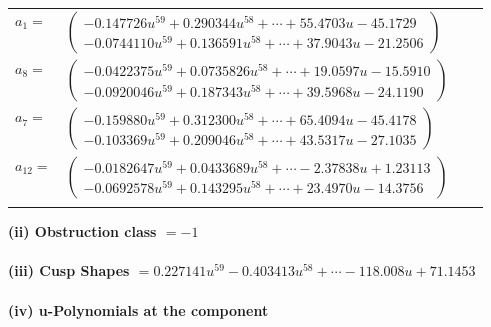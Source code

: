\documentclass[1p]{elsarticle_modified}
\theoremstyle{definition}
\begin{document}
\begin{tabular}{m{7pt} m{180pt} m{7pt} m{180pt} }
\flushright $a_{1}=$&$\begin{pmatrix}-0.147726 u^{59}+0.290344 u^{58}+\cdots+55.4703 u-45.1729\\-0.0744110 u^{59}+0.136591 u^{58}+\cdots+37.9043 u-21.2506\end{pmatrix}$ \\
\flushright $a_{8}=$&$\begin{pmatrix}-0.0422375 u^{59}+0.0735826 u^{58}+\cdots+19.0597 u-15.5910\\-0.0920046 u^{59}+0.187343 u^{58}+\cdots+39.5968 u-24.1190\end{pmatrix}$ \\
\flushright $a_{7}=$&$\begin{pmatrix}-0.159880 u^{59}+0.312300 u^{58}+\cdots+65.4094 u-45.4178\\-0.103369 u^{59}+0.209046 u^{58}+\cdots+43.5317 u-27.1035\end{pmatrix}$ \\
\flushright $a_{12}=$&$\begin{pmatrix}-0.0182647 u^{59}+0.0433689 u^{58}+\cdots-2.37838 u+1.23113\\-0.0692578 u^{59}+0.143295 u^{58}+\cdots+23.4970 u-14.3756\end{pmatrix}$\\&\end{tabular}
\flushleft \textbf{(ii) Obstruction class $= -1$}\\~\\
\flushleft \textbf{(iii) Cusp Shapes $= 0.227141 u^{59}-0.403413 u^{58}+\cdots-118.008 u+71.1453$}\\~\\
\newpage\renewcommand{\arraystretch}{1}
\flushleft \textbf{(iv) u-Polynomials at the component}\newline \\
\end{document}
